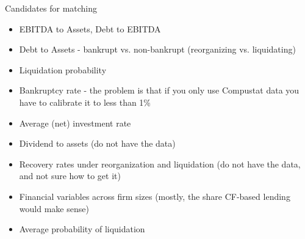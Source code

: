\documentclass[12pt]{article}
\begin{document}
\noindent Candidates for matching
\begin{itemize}\setlength\itemsep{0em} \small
    \item EBITDA to Assets, Debt to EBITDA
    \item Debt to Assets - bankrupt vs. non-bankrupt (reorganizing vs. liquidating)
    \item Liquidation probability
    \item Bankruptcy rate - the problem is that if you only use Compustat data you have to calibrate it to less than 1\%
    \item Average (net) investment rate
    \item Dividend to assets (do not have the data)
    \item Recovery rates under reorganization and liquidation (do not have the data, and not sure how to get it)
    \item Financial variables across firm sizes (mostly, the share CF-based lending would make sense)
    \item Average probability of liquidation
    \end{itemize} \normalsize
\end{document}
